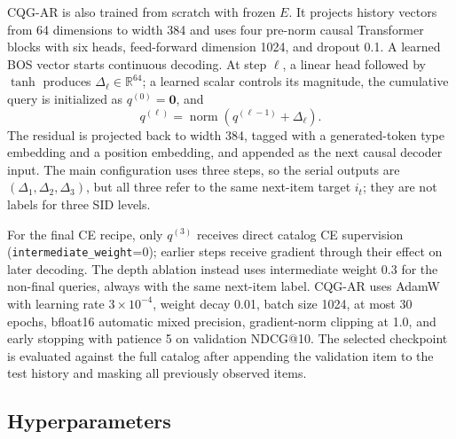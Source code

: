 \documentclass[preprint,12pt]{elsarticle}
\begin{document}
CQG-AR is also trained from scratch with frozen \(E\).  It projects history
vectors from 64 dimensions to width 384 and uses four pre-norm causal
Transformer blocks with six heads, feed-forward dimension 1024, and dropout
0.1.  A learned BOS vector starts continuous decoding.  At step \(\ell\), a
linear head followed by \(\tanh\) produces
\(\Delta_\ell\in\mathbb{R}^{64}\); a learned scalar controls its magnitude,
the cumulative query is initialized as \(q^{(0)}=\mathbf{0}\), and
\[
 q^{(\ell)}=\operatorname{norm}(q^{(\ell-1)}+\Delta_\ell).
\]
The residual is projected back to width 384, tagged with a generated-token
type embedding and a position embedding, and appended as the next causal
decoder input.  The main configuration uses three steps, so the serial
outputs are \((\Delta_1,\Delta_2,\Delta_3)\), but all three refer to the same
next-item target \(i_t\); they are not labels for three SID levels.

For the final CE recipe, only \(q^{(3)}\) receives direct catalog CE
supervision (\texttt{intermediate\_weight}=0); earlier steps receive gradient
through their effect on later decoding.  The depth ablation instead uses
intermediate weight 0.3 for the non-final queries, always with the same
next-item label.  CQG-AR uses AdamW with learning rate \(3\times10^{-4}\),
weight decay 0.01, batch size 1024, at most 30 epochs, bfloat16 automatic
mixed precision, gradient-norm clipping at 1.0, and early stopping with
patience 5 on validation NDCG@10.  The selected checkpoint is evaluated
against the full catalog after appending the validation item to the test
history and masking all previously observed items.



\subsection{Hyperparameters}
\label{app:hparams}
\end{document}
